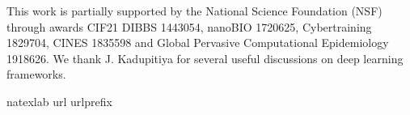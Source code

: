 \documentclass[12pt]{article}
\theoremstyle{definition}
\renewcommand{\_}{%
    \textunderscore\hspace{0pt}%
}
\begin{document}
\vskip 14pt

This work is partially supported by the National Science Foundation (NSF) through awards CIF21 DIBBS 1443054, nanoBIO 1720625, Cybertraining 1829704, CINES 1835598 and Global Pervasive Computational Epidemiology 1918626.  We thank J. Kadupitiya for several useful discussions on deep learning frameworks.
\par



%
%


\fontsize{11}{1em}\selectfont
\renewcommand\bibname{\bfseries{\fontsize{14pt}{1em}\selectfont References}}
\expandafter\ifx\csname
natexlab\endcsname\relax\def\natexlab#1{#1}\fi
\expandafter\ifx\csname url\endcsname\relax
  \def\url#1{\texttt{#1}}\fi
\expandafter\ifx\csname urlprefix\endcsname\relax\def\urlprefix{URL}\fi



%


\end{document}
